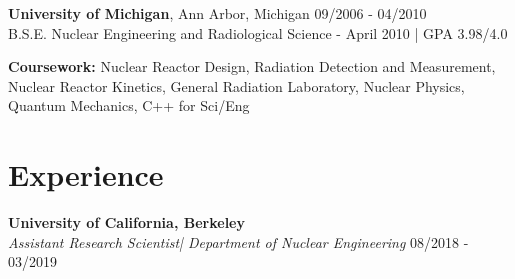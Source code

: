 \documentclass[margin,line]{res}
\newenvironment{list1}{
  \begin{list}{\ding{113}}{%
      \setlength{\itemsep}{0in}
      \setlength{\parsep}{0in} \setlength{\parskip}{0in}
      \setlength{\topsep}{0in} \setlength{\partopsep}{0in} 
      \setlength{\leftmargin}{0.17in}}}{\end{list}}
\begin{document}
\begin{resume}
{\bf University of Michigan}, Ann Arbor, Michigan \hfill 09/2006 - 04/2010\\
B.S.E. Nuclear Engineering and Radiological Science - April 2010 | GPA 3.98/4.0
\begin{list1}
\item[] {\bf \small Coursework:} Nuclear Reactor Design, Radiation Detection 
                                 and Measurement, Nuclear Reactor Kinetics,
                                 General Radiation Laboratory, Nuclear Physics,
                                 Quantum Mechanics, C++ for Sci/Eng
\end{list1}

\section{\sc Experience}
{\bf University of California, Berkeley} \\ 
{\em Assistant Research Scientist\footnotemark | Department of Nuclear Engineering} \hfill 08/2018 - 03/2019


\end{resume}
\end{document}
